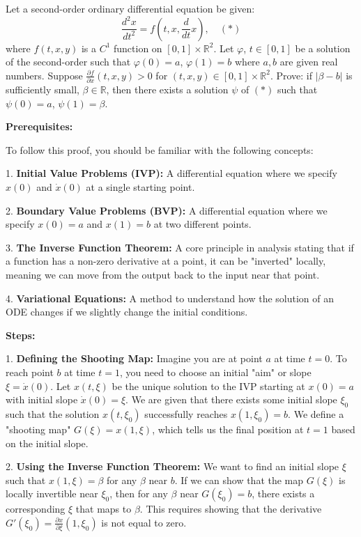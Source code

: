 \begin{exercise}
\label{analysis:2023:2}
Let a second-order ordinary differential equation be given:
\[
\frac{d^2 x}{dt^2} = f(t,x,\frac{d}{dt}x), \quad (*)
\]
where $f(t,x,y)$ is a $C^1$ function on $[0,1]\times\mathbb{R}^2$. Let $\varphi$, $t\in[0,1]$ be a solution of the second-order such that $\varphi(0)=a$, $\varphi(1)=b$ where $a,b$ are given real numbers. Suppose $\frac{\partial f}{\partial x}(t,x,y) > 0$ for $(t,x,y)\in[0,1]\times\mathbb{R}^2$. Prove: if $|\beta-b|$ is sufficiently small, $\beta\in\mathbb{R}$, then there exists a solution $\psi$ of $(*)$ such that $\psi(0)=a$, $\psi(1)=\beta$.
\end{exercise}

\begin{solution}
\textbf{Prerequisites:}

To follow this proof, you should be familiar with the following concepts:

1. \textbf{Initial Value Problems (IVP):} A differential equation where we specify $x(0)$ and $\dot{x}(0)$ at a single starting point.

2. \textbf{Boundary Value Problems (BVP):} A differential equation where we specify $x(0)=a$ and $x(1)=b$ at two different points.

3. \textbf{The Inverse Function Theorem:} A core principle in analysis stating that if a function has a non-zero derivative at a point, it can be "inverted" locally, meaning we can move from the output back to the input near that point.

4. \textbf{Variational Equations:} A method to understand how the solution of an ODE changes if we slightly change the initial conditions.

\textbf{Steps:}

1. \textbf{Defining the Shooting Map:}
Imagine you are at point $a$ at time $t=0$. To reach point $b$ at time $t=1$, you need to choose an initial "aim" or slope $\xi = \dot{x}(0)$. Let $x(t, \xi)$ be the unique solution to the IVP starting at $x(0)=a$ with initial slope $\dot{x}(0)=\xi$. We are given that there exists some initial slope $\xi_0$ such that the solution $x(t, \xi_0)$ successfully reaches $x(1, \xi_0) = b$. We define a "shooting map" $G(\xi) = x(1, \xi)$, which tells us the final position at $t=1$ based on the initial slope.

2. \textbf{Using the Inverse Function Theorem:}
We want to find an initial slope $\xi$ such that $x(1, \xi) = \beta$ for any $\beta$ near $b$. If we can show that the map $G(\xi)$ is locally invertible near $\xi_0$, then for any $\beta$ near $G(\xi_0) = b$, there exists a corresponding $\xi$ that maps to $\beta$. This requires showing that the derivative $G'(\xi_0) = \frac{\partial x}{\partial \xi}(1, \xi_0)$ is not equal to zero.


\end{solution}
